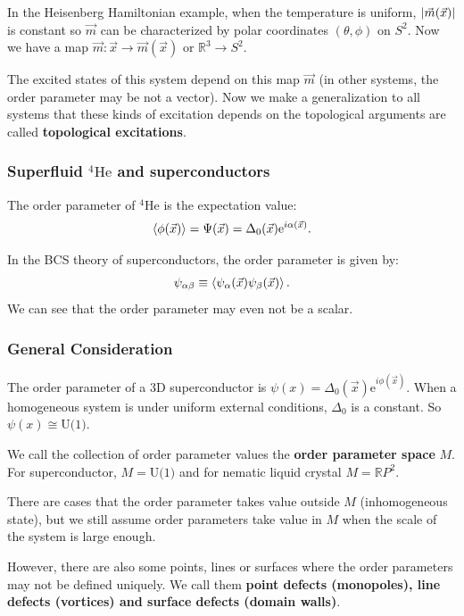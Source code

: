 \documentclass[10pt]{article}
\begin{document}
In the Heisenberg Hamiltonian example, when the temperature is uniform, $\abs{\vec{m}(\vec{x})}$ is constant so $\vec{m}$ can be characterized by polar coordinates $(\theta,\phi)$ on $S^2$.
Now we have a map $\vec{m}: \vec{x}\to\vec{m}(\vec{x})$ or $\mathbb{R}^3\rightarrow S^2$.

The excited states of this system depend on this map $\vec{m}$ (in other systems, the order parameter may be not a vector).
Now we make a generalization to all systems that these kinds of excitation depends on the topological arguments are called \textbf{topological excitations}.

\subsubsection{Superfluid \texorpdfstring{{}$^4\text{He}$}{} and superconductors}
The order parameter of  $^4\text{He}$ is the expectation value:
\begin{align}
    \expval{\phi(\vec{x})}=\Psi(\vec{x})=\Delta_0 (\vec{x})\mathrm{e}^{i\alpha(\vec{x})}.
\end{align}

In the BCS theory of superconductors, the order parameter is given by:
\begin{align}
    \psi_{\alpha\beta}\equiv\expval{\psi_\alpha(\vec{x})\psi_\beta(\vec{x})}.
\end{align}
We can see that the order parameter may even not be a scalar.

\subsubsection{General Consideration}
The order parameter of a 3D superconductor is $\psi(x)=\Delta_0(\vec{x})\text{e}^{i\phi(\vec{x})}$.
When a homogeneous system is under uniform external conditions, $\Delta_0$ is a constant.
So $\psi(x)\cong\text{U(1)}$.

We call the collection of order parameter values the \textbf{order parameter space} $M$.
For superconductor, $M=\text{U(1)}$ and for nematic liquid crystal $M=\mathbb{R}P^2$.

There are cases that the order parameter takes value outside $M$ (inhomogeneous state), but we still assume order parameters take value in $M$ when the scale of the system is large enough.

However, there are also some points, lines or surfaces where the order parameters may not be defined uniquely.
We call them \textbf{point defects (monopoles), line defects (vortices) and surface defects (domain walls)}.
\end{document}
